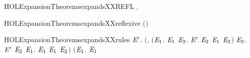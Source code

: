 \begin{SaveVerbatim}{HOLExpansionTheoremsexpandsXXREFL}
\HOLTokenTurnstile{} \HOLSymConst{\HOLTokenForall{}}.   
\end{SaveVerbatim}
\newcommand{\HOLExpansionTheoremsexpandsXXREFL}{\UseVerbatim{HOLExpansionTheoremsexpandsXXREFL}}
\begin{SaveVerbatim}{HOLExpansionTheoremsexpandsXXreflexive}
\HOLTokenTurnstile{}  \ensuremath{(}\ensuremath{)}
\end{SaveVerbatim}
\newcommand{\HOLExpansionTheoremsexpandsXXreflexive}{\UseVerbatim{HOLExpansionTheoremsexpandsXXreflexive}}
\begin{SaveVerbatim}{HOLExpansionTheoremsexpandsXXrules}
\HOLTokenTurnstile{} \HOLSymConst{\HOLTokenForall{}} \ensuremath{\HOLBoundVar{E}\sp{\prime}}.
       \ensuremath{(}\HOLSymConst{\HOLTokenForall{}}.
            \ensuremath{(}\HOLSymConst{\HOLTokenForall{}}\ensuremath{\HOLBoundVar{E}\sb{\mathrm{1}}}.
                  \HOLTokenTransBegin{} \HOLTokenTransEnd \ensuremath{\HOLBoundVar{E}\sb{\mathrm{1}}} \HOLSymConst{\HOLTokenImp{}}
                 \HOLSymConst{\HOLTokenExists{}}\ensuremath{\HOLBoundVar{E}\sb{\mathrm{2}}}. \ensuremath{\HOLBoundVar{E}\sp{\prime}} \HOLTokenTransBegin{} \HOLTokenTransEnd \ensuremath{\HOLBoundVar{E}\sb{\mathrm{2}}} \HOLSymConst{\HOLTokenConj{}} \ensuremath{\HOLBoundVar{E}\sb{\mathrm{1}}}  \ensuremath{\HOLBoundVar{E}\sb{\mathrm{2}}}\ensuremath{)} \HOLSymConst{\HOLTokenConj{}}
            \HOLSymConst{\HOLTokenForall{}}\ensuremath{\HOLBoundVar{E}\sb{\mathrm{2}}}.
                \ensuremath{\HOLBoundVar{E}\sp{\prime}} \HOLTokenTransBegin{} \HOLTokenTransEnd \ensuremath{\HOLBoundVar{E}\sb{\mathrm{2}}} \HOLSymConst{\HOLTokenImp{}}
                \HOLSymConst{\HOLTokenExists{}}\ensuremath{\HOLBoundVar{E}\sb{\mathrm{1}}}.  \HOLTokenWeakTransBegin{} \HOLTokenWeakTransEnd \ensuremath{\HOLBoundVar{E}\sb{\mathrm{1}}} \HOLSymConst{\HOLTokenConj{}} \ensuremath{\HOLBoundVar{E}\sb{\mathrm{1}}}  \ensuremath{\HOLBoundVar{E}\sb{\mathrm{2}}}\ensuremath{)} \HOLSymConst{\HOLTokenConj{}}
       \ensuremath{(}\HOLSymConst{\HOLTokenForall{}}\ensuremath{\HOLBoundVar{E}\sb{\mathrm{1}}}.
             \HOLTokenTransBegin\HOLConst{\ensuremath{\tau}}\HOLTokenTransEnd \ensuremath{\HOLBoundVar{E}\sb{\mathrm{1}}} \HOLSymConst{\HOLTokenImp{}}

\end{SaveVerbatim}

